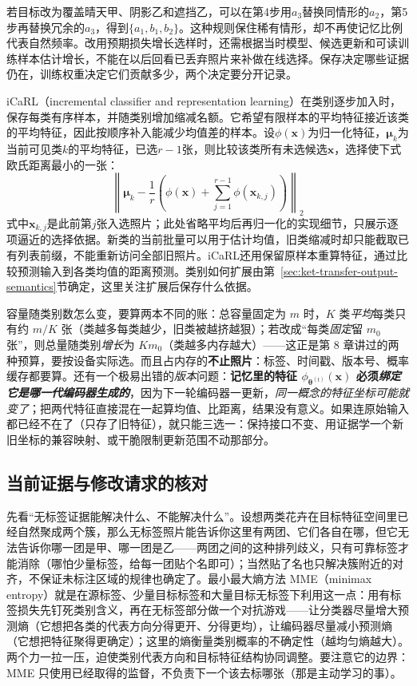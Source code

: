 若目标改为覆盖晴天甲、阴影乙和遮挡乙，可以在第4步用$a_3$替换同情形的$a_2$，第5步再替换冗余的$a_3$，得到$\{a_1,b_1,b_2\}$。这种规则保住稀有情形，却不再使记忆比例代表自然频率。改用预期损失增长选样时，还需根据当时模型、候选更新和可读训练样本估计增长，不能在以后回看已丢弃照片来补做在线选择。保存决定哪些证据仍在，训练权重决定它们贡献多少，两个决定要分开记录。

iCaRL（incremental classifier and representation learning）在类别逐步加入时，保存每类有序样本，并随类别增加缩减名额。它希望有限样本的平均特征接近该类的平均特征，因此按顺序补入能减少均值差的样本。设$\phi(\bm{x})$为归一化特征，$\bm{\mu}_k$为当前可见类$k$的平均特征，已选$r-1$张，则比较该类所有未选候选$\bm{x}$，选择使下式欧氏距离最小的一张：
\begin{equation}
\left\lVert\bm{\mu}_k-
\frac{1}{r}\left(\phi(\bm{x})+
\sum_{j=1}^{r-1}\phi(\bm{x}_{k,j})\right)\right\rVert_2
\label{eq:ket-update-herding}
\end{equation}
式中$\bm{x}_{k,j}$是此前第$j$张入选照片；此处省略平均后再归一化的实现细节，只展示逐项逼近的选择依据。新类的当前批量可以用于估计均值，旧类缩减时却只能截取已有列表前缀，不能重新访问全部旧照片。iCaRL还用保留原样本重算特征，通过比较预测输入到各类均值的距离预测。类别如何扩展由第~\ref{sec:ket-transfer-output-semantics}节确定，这里关注扩展后保存什么依据。

容量随类别数怎么变，要算两本不同的账：总容量固定为 $m$ 时，$K$ 类\emph{平均}每类只有约 $m/K$ 张（类越多每类越少，旧类被越挤越狠）；若改成“每类\emph{固定}留 $m_0$ 张”，则总量随类别\emph{增长}为 $Km_0$（类越多内存越大）——这正是第 8 章讲过的两种预算，要按设备实际选。而且占内存的\textbf{不止照片}：标签、时间戳、版本号、概率缓存都要算。还有一个极易出错的\emph{版本}问题：\textbf{记忆里的特征 $\phi_{\bm{\theta}^{(t)}}(\bm{x})$ 必须\emph{绑定它是哪一代编码器生成的}}，因为下一轮编码器一更新，\emph{同一概念的特征坐标可能就变了}；把两代特征直接混在一起算均值、比距离，结果没有意义。如果连原始输入都已经不在了（只存了旧特征），就只能三选一：保持接口不变、用证据学一个新旧坐标的兼容映射、或干脆限制更新范围不动那部分。

\subsection{当前证据与修改请求的核对}
\label{sec:ket-update-current-evidence}

先看“无标签证据能解决什么、不能解决什么”。设想两类花卉在目标特征空间里已经自然聚成两个簇，那么无标签照片能告诉你这里有两团、它们各自在哪，但它无法告诉你哪一团是甲、哪一团是乙——两团之间的这种排列歧义，只有可靠标签才能消除（哪怕少量标签，给每一团贴个名即可）；当然贴了名也只解决簇附近的对齐，不保证未标注区域的规律也确定了。最小最大熵方法 MME（minimax entropy）就是在源标签、少量目标标签和大量目标无标签下利用这一点：用有标签损失先钉死类别含义，再在无标签部分做一个对抗游戏——让分类器尽量增大预测熵（它想把各类的代表方向分得更开、分得更均），让编码器尽量减小预测熵（它想把特征聚得更确定）；这里的熵衡量类别概率的不确定性（越均匀熵越大）。两个力一拉一压，迫使类别代表方向和目标特征结构协同调整。要注意它的边界：MME 只使用已经取得的监督，不负责下一个该去标哪张（那是主动学习的事）。

